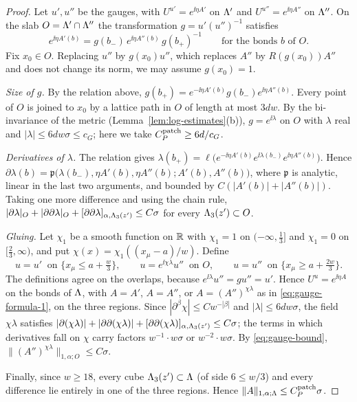 \begin{proof}
Let $u',u''$ be the gauges, with $U^{u'}=e^{\ii\eta A'}$ on $\Lambda'$ and $U^{u''}=e^{\ii\eta A''}$ on $\Lambda''$. On the slab $O=\Lambda'\cap\Lambda''$ the transformation $g=u'(u'')^{-1}$ satisfies
\[
e^{\ii\eta A'(b)}=g(b_-)\,e^{\ii\eta A''(b)}\,g(b_+)^{-1}\qquad\text{for the bonds }b\text{ of }O .
\]
Fix $x_0\in O$. Replacing $u''$ by $g(x_0)u''$, which replaces $A''$ by $R(g(x_0))A''$ and does not change its norm, we may assume $g(x_0)=1$.

\emph{Size of $g$.} By the relation above, $g(b_+)=e^{-\ii\eta A'(b)}g(b_-)e^{\ii\eta A''(b)}$. Every point of $O$ is joined to $x_0$ by a lattice path in $O$ of length at most $3dw$. By the bi-invariance of the metric (Lemma~\ref{lem:log-estimates}(b)), $g=e^{\ii\lambda}$ on $O$ with $\lambda$ real and $|\lambda|\le6dw\sigma\le c_G$; here we take $C^{\rm patch}_P\ge6d/c_G$.

\emph{Derivatives of $\lambda$.} The relation gives $\lambda(b_+)=\ell\big(e^{-\ii\eta A'(b)}e^{\ii\lambda(b_-)}e^{\ii\eta A''(b)}\big)$. Hence $\partial\lambda(b)=\mathfrak p\big(\lambda(b_-),\eta A'(b),\eta A''(b);A'(b),A''(b)\big)$, where $\mathfrak p$ is analytic, linear in the last two arguments, and bounded by $C(|A'(b)|+|A''(b)|)$. Taking one more difference and using the chain rule, $|\partial\lambda|_O+|\partial\partial\lambda|_O+[\partial\partial\lambda]_{\alpha,\Lambda_3(z')}\le C\sigma$ for every $\Lambda_3(z')\subset O$.

\emph{Gluing.} Let $\chi_1$ be a smooth function on $\mathbb R$ with $\chi_1=1$ on $(-\infty,\frac13]$ and $\chi_1=0$ on $[\frac23,\infty)$, and put $\chi(x)=\chi_1((x_\mu-a)/w)$. Define
\[
u=u'\ \text{ on }\{x_\mu\le a+\tfrac w3\},\qquad u=e^{\ii\chi\lambda}u''\ \text{ on }O,\qquad u=u''\ \text{ on }\{x_\mu\ge a+\tfrac{2w}3\}.
\]
The definitions agree on the overlaps, because $e^{\ii\lambda}u''=gu''=u'$. Hence $U^u=e^{\ii\eta A}$ on the bonds of $\Lambda$, with $A=A'$, $A=A''$, or $A=(A'')^{\chi\lambda}$ as in \eqref{eq:gauge-formula-1}, on the three regions. Since $|\partial^\beta\chi|\le Cw^{-|\beta|}$ and $|\lambda|\le6dw\sigma$, the field $\chi\lambda$ satisfies $|\partial(\chi\lambda)|+|\partial\partial(\chi\lambda)|+[\partial\partial(\chi\lambda)]_{\alpha,\Lambda_3(z')}\le C\sigma$; the terms in which derivatives fall on $\chi$ carry factors $w^{-1}\cdot w\sigma$ or $w^{-2}\cdot w\sigma$. By \eqref{eq:gauge-bound}, $\|(A'')^{\chi\lambda}\|_{1,\alpha;O}\le C\sigma$.

Finally, since $w\ge18$, every cube $\Lambda_3(z')\subset\Lambda$ (of side $6\le w/3$) and every difference lie entirely in one of the three regions. Hence $\|A\|_{1,\alpha;\Lambda}\le C^{\rm patch}_P\sigma$.
\end{proof}

